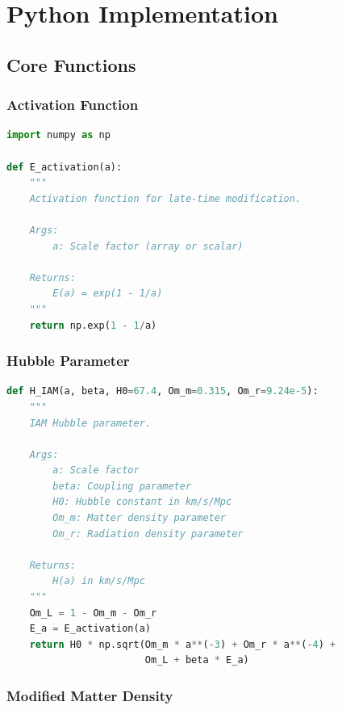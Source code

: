 \documentclass[11pt]{article}
\begin{document}
\section{Python Implementation}

\subsection{Core Functions}

\subsubsection{Activation Function}

\begin{lstlisting}[language=Python]
import numpy as np

def E_activation(a):
    """
    Activation function for late-time modification.
    
    Args:
        a: Scale factor (array or scalar)
    
    Returns:
        E(a) = exp(1 - 1/a)
    """
    return np.exp(1 - 1/a)
\end{lstlisting}

\subsubsection{Hubble Parameter}

\begin{lstlisting}[language=Python]
def H_IAM(a, beta, H0=67.4, Om_m=0.315, Om_r=9.24e-5):
    """
    IAM Hubble parameter.
    
    Args:
        a: Scale factor
        beta: Coupling parameter
        H0: Hubble constant in km/s/Mpc
        Om_m: Matter density parameter
        Om_r: Radiation density parameter
    
    Returns:
        H(a) in km/s/Mpc
    """
    Om_L = 1 - Om_m - Om_r
    E_a = E_activation(a)
    return H0 * np.sqrt(Om_m * a**(-3) + Om_r * a**(-4) + 
                        Om_L + beta * E_a)
\end{lstlisting}

\subsubsection{Modified Matter Density}
\end{document}
